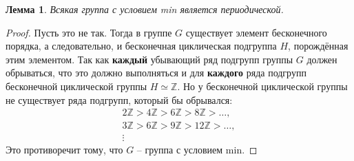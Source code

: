 \documentclass{article}
\newtheorem{lemma}{Лемма}[section]
\begin{document}
\begin{lemma} \label{ffjqpwei}
    Всякая группа с условием min является периодической.
\end{lemma}
\begin{proof}
    Пусть это не так. Тогда в группе $G$ существует элемент бесконечного порядка, а следовательно, и бесконечная циклическая подгруппа $H$, порождённая этим элементом. Так как \textbf{каждый} убывающий ряд подгрупп группы $G$ должен обрываться, что это должно выполняться и для \textbf{каждого} ряда подгрупп бесконечной циклической группы $H \simeq \mathbb{Z}$. Но у бесконечной циклической группы не существует ряда подгрупп, который бы обрывался:
    \begin{gather*}
        2\mathbb{Z} > 4 \mathbb{Z} > 6 \mathbb{Z} > 8\mathbb{Z} > \ldots, \\
        3 \mathbb{Z} > 6 \mathbb{Z} > 9 \mathbb{Z} > 12 \mathbb{Z} > \ldots, \\
        \vdots
    \end{gather*}
    Это противоречит тому, что $G$ -- группа с условием min.
\end{proof}
\end{document}
